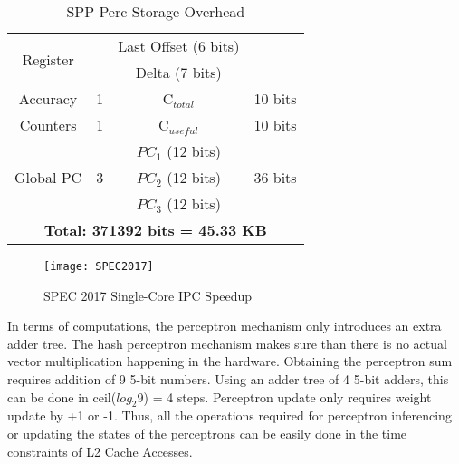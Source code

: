 \begin{table}[h]
\begin{adjustwidth}{-0.5cm}{}
\begin{tabular}{|c|c|c|c|}
        \multirow{2}{1.2cm}{Register}               &                        & Last Offset (6 bits) &                               \\
                                                    &                        & Delta (7 bits)       &                               \\
    \hline
        Accuracy        & 1     & C$_{total}$       & 10 bits   \\
        Counters        & 1     & C$_{useful}$      & 10 bits   \\
    \hline
        \multirow{3}{1.5cm}{Global PC\newline}      &       & $PC_1$ (12 bits)      &           \\
        \multirow{2}{1.5cm}{~Trackers}              & 3     & $PC_2$ (12 bits)      & 36 bits   \\
                                                    &       & $PC_3$ (12 bits)      &           \\
    \hline
        \multicolumn{4}{|c|}{\textbf{Total: 371392 bits = 45.33 KB}}\\
    \hline
    \end{tabular}
    \caption{SPP-Perc Storage Overhead}
    \label{tab:PPF_overhead}
\end{adjustwidth}
\end{table}


\begin{figure}[h]
\texttt{[image: SPEC2017]}
\caption{SPEC 2017 Single-Core IPC Speedup}
\label{Fig:SPEC2017_1core}
\end{figure}


In terms of computations, the perceptron mechanism only introduces an
extra adder tree.  The hash perceptron mechanism makes sure than there
is no actual vector multiplication happening in the hardware.
Obtaining the perceptron sum requires addition of 9 5-bit numbers.
Using an adder tree of 4 5-bit adders, this can be done in
ceil($log_{2}9$) = 4 steps.  Perceptron update only requires weight
update by +1 or -1.  Thus, all the operations required for perceptron
inferencing or updating the states of the perceptrons can be
easily done in the time constraints of L2 Cache Accesses.

